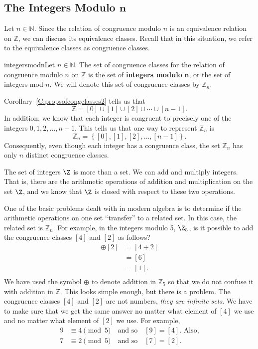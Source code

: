 \subsection*{The Integers Modulo  $\boldsymbol{n}$}
Let  $n \in \mathbb{N}$.  Since the relation of congruence modulo  $n$  is an equivalence relation on  $\mathbb{Z}$, we can discuss its equivalence classes.  Recall that in this situation, we refer to the equivalence classes as congruence classes. 

\begin{defbox}{integersmodn}{Let  $n \in \mathbb{N}$.  The set of congruence classes for the relation of congruence modulo  $n$  on  $\mathbb{Z}$ is the set of \textbf{integers modulo}  $\boldsymbol{n}$,
%
 or the set of integers mod  $n$.  We will denote this set of congruence classes by  $\mathbb{Z}_{n} $.} \label{sym:integersmodn}
\end{defbox}
%
\noindent
Corollary~\ref{C:propsofcongclasses2} tells us that  
\[
\mathbb{Z} = [ 0 ] \cup [ 1 ] \cup [ 2 ] \cup   \cdots  \cup  [ {n - 1} ].
\]
In addition, we know that each integer is congruent to precisely one of the integers  
$0, 1, 2,  \ldots , n - 1$.  This tells us that one way to represent  $\mathbb{Z}_{n} $ is
\[
\mathbb{Z}_{n}  = \left\{ {[ 0 ], [ 1 ], [ 2 ],  \ldots, [ {n - 1} ]} \right\}.
\]
Consequently, even though each integer has a congruence class, the set  $\mathbb{Z}_{n} $  has  
only $n$  distinct congruence classes.  


The set of integers  $\Z$ is more than a set.  We can add and multiply integers.  That 
is, there are the arithmetic operations of addition and multiplication on the set  
$\Z$, and we know that  $\Z$  is closed with respect to these two operations.  

One of the basic problems dealt with in modern algebra is to determine if the arithmetic operations on one set ``transfer'' to a related set.  In this case, the related set is  $\mathbb{Z}_{n} $.  For example, in the integers modulo  5, $\Z_5$, is it possible to add the congruence classes  $[ 4 ]$  and  $[ 2 ]$ as follows?
\begin{align*}
  [ 4 ] \oplus [ 2 ] &= [ {4 + 2} ] \\ 
                     &= [ 6 ] \\ 
                     &= [ 1 ]. \\ 
\end{align*}
We have used the symbol  $ \oplus $ to denote addition in  $\mathbb{Z}_{5} $ so that we do not confuse it with addition in  $\mathbb{Z}$.  This looks simple enough, but there is a problem.  The congruence classes  $[ 4 ]$  and  $[ 2 ]$ are not numbers, \emph{they are infinite sets}.  We have to make sure that we get the same answer no matter what element of  $[ 4 ]$ we use and no matter what element of  $[ 2 ]$  we use.  
For example, 
\begin{align*}
9 &\equiv 4 \pmod 5 \quad \text{and so} \quad [ 9 ] = [ 4 ].  \text{  Also,} \\ 
7 &\equiv 2 \pmod 5 \quad \text{and so} \quad [ 7 ] = [ 2 ]. 
\end{align*} 
 
